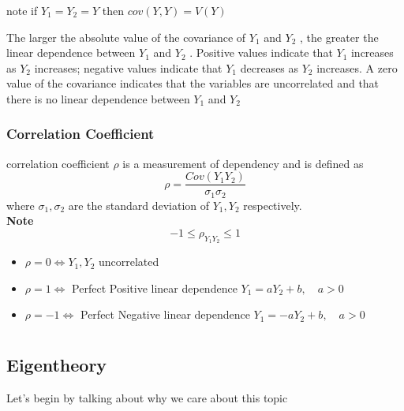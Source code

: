 \documentclass{report}
\begin{document}
note if $Y_1 = Y_2 = Y$ then $cov(Y,Y) = V(Y)$

The larger the absolute value of the covariance of $Y_1$ and $Y_2$ , the greater the
linear dependence between $Y_1$ and $Y_2$ . Positive values indicate that $Y_1$ increases as $Y_2$
increases; negative values indicate that $Y_1$ decreases as $Y_2$ increases. A zero value of
the covariance indicates that the variables are uncorrelated and that there is no linear
dependence between $Y_1$ and $Y_2$ 
\subsection[correlation coeff]{Correlation Coefficient}
\textsf{correlation coefficient} $\rho$ is a measurement of dependency and is defined as $$\rho = \frac{Cov(Y_1Y_2)}{\sigma_1\sigma_2}$$
where $\sigma_1, \sigma_2$ are the standard deviation of $Y_1, Y_2$ respectively.\\
\textbf{Note} $$-1 \leq \rho_{Y_1Y_2} \leq 1$$
\begin{itemize}
	\item $\rho = 0 \iff Y_1,Y_2$ uncorrelated
	\item $\rho = 1 \iff$ Perfect Positive linear dependence $Y_1 = aY_2 + b, \quad a>0$
	\item $\rho = -1 \iff$ Perfect Negative linear dependence $Y_1 = -aY_2 + b, \quad a>0$  
\end{itemize}
\chapter{}
\section{Eigentheory}


Let's begin by talking about why we care about this topic
\end{document}
